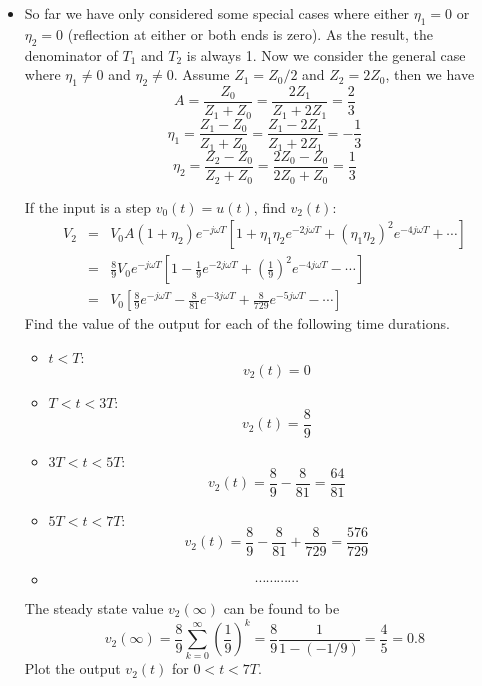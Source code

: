 \begin{itemize}

\item So far we have only considered some special cases where either $\eta_1=0$ 
  or $\eta_2=0$ (reflection at either or both ends is zero). As the result, the 
  denominator of $T_1$ and $T_2$ is always 1. Now we consider the general case
  where $\eta_1\ne 0$ and $\eta_2 \ne 0$. Assume $Z_1=Z_0/2$ and $Z_2=2Z_0$, then 
  we have
  \[ A=\frac{Z_0}{Z_1+Z_0}=\frac{2Z_1}{Z_1+2Z_1}=\frac{2}{3} \]
  \[ \eta_1=\frac{Z_1-Z_0}{Z_1+Z_0}=\frac{Z_1-2Z_1}{Z_1+2Z_1}=-\frac{1}{3} \]
  \[ \eta_2=\frac{Z_2-Z_0}{Z_2+Z_0}=\frac{2Z_0-Z_0}{2Z_0+Z_0}=\frac{1}{3}  \]

  If the input is a step $v_0(t)=u(t)$, find $v_2(t)$:
  \begin{eqnarray}
    V_2&=&V_0A(1+\eta_2)e^{-j\omega T}\left[1+\eta_1\eta_2 e^{-2j\omega T}
    +(\eta_1\eta_2)^2 e^{-4j\omega T}+\cdots \right]
    \nonumber \\
    &=&\frac{8}{9}V_0 e^{-j\omega T}\left[1-\frac{1}{9} e^{-2j\omega T}
    +\left(\frac{1}{9}\right)^2 e^{-4j\omega T}-\cdots \right]
    \nonumber \\
    &=&V_0\left[ \frac{8}{9} e^{-j\omega T}-\frac{8}{81}e^{-3j\omega T}
    +\frac{8}{729}e^{-5j\omega T}-\cdots \right]
    \nonumber 
  \end{eqnarray}
  Find the value of the output for each of the following time durations.
  \begin{itemize}
  \item $t<T:$ 
    \[ v_2(t)=0 \]
  \item $T<t<3T:$ 
    \[	v_2(t)=\frac{8}{9}	\]
  \item $3T<t<5T:$ 
    \[ v_2(t)=\frac{8}{9}-\frac{8}{81}=\frac{64}{81} \]
  \item $5T<t<7T:$ 
    \[ v_2(t)=\frac{8}{9}-\frac{8}{81}+\frac{8}{729}=\frac{576}{729} \]
  \item
    \[	\cdots  \cdots  \cdots  \cdots  \]
  \end{itemize}
  The steady state value $v_2(\infty)$ can be found to be
  \[ v_2(\infty)=\frac{8}{9}\sum_{k=0}^\infty \left(\frac{1}{9}\right)^k
  =\frac{8}{9}\frac{1}{1-(-1/9)}=\frac{4}{5}=0.8 \]
  Plot the output $v_2(t)$ for $0<t<7T$. 


\end{itemize}
